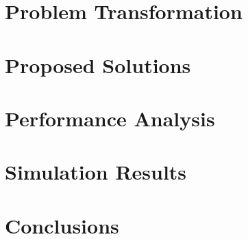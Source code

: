 \documentclass[lettersize,journal]{IEEEtran}
\theoremstyle{custom}
\newtheorem{Prob}{Problem}
\begin{document}
\section{Problem Transformation}

\section{Proposed Solutions}

\section{Performance Analysis}

\section{Simulation Results}

\section{Conclusions}


 

% 

\end{document}
